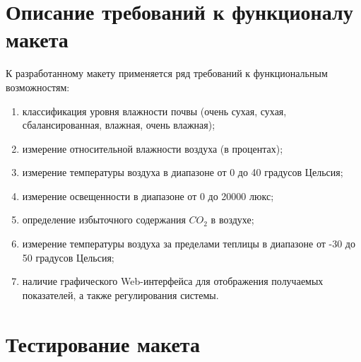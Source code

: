 \section{Описание требований к функционалу макета}

К разработанному макету применяется ряд требований к функциональным возможностям:

\begin{enumerate}
    \item классификация уровня влажности почвы (очень сухая, сухая, сбалансированная, влажная, очень влажная);
    \item измерение относительной влажности воздуха (в процентах);
    \item измерение температуры воздуха в диапазоне от 0 до 40 градусов Цельсия;
    \item измерение освещенности в диапазоне от 0 до 20000 люкс;
    \item определение избыточного содержания $CO_2$ в воздухе;
    \item измерение температуры воздуха за пределами теплицы в диапазоне от -30 до 50 градусов Цельсия;
    \item наличие графического Web-интерфейса для отображения получаемых показателей, а также регулирования системы.
\end{enumerate}

\section{Тестирование макета}

